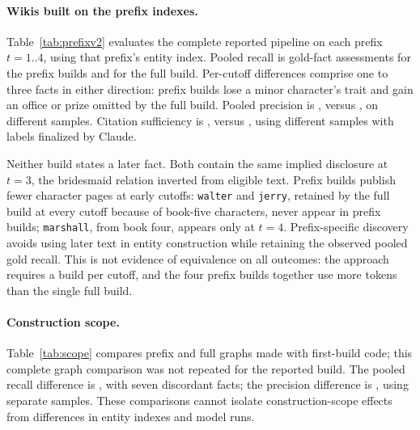 \begin{table}[t]
\caption{The reported \sys built on entity indexes discovered from the prefix (\emph{prefix}: one build
per cutoff, every stage on volumes $1..t$) against the same cutoff of its five-volume build (\emph{full}).
Metrics as in Table~\ref{tab:full-results}; precision is on a different sample of 40 assertions in each
build. The prefix builds received a single LLM labeling pass; the full build's labels were
finalized by Claude Opus~5.5 (Appendix~\ref{app:annotation}). The full
build's tokens, for all five cutoffs at once, are in Table~\ref{tab:efficiency}.
Bold cyan cells mark the higher rate where the builds differ; bold magenta cells mark non-zero
disclosure counts.}
\label{tab:prefixv2}
\end{table}

\paragraph{Wikis built on the prefix indexes.}
Table~\ref{tab:prefixv2} evaluates the complete reported pipeline on each prefix
$t=1..4$, using that prefix's entity index. Pooled recall is
 gold-fact assessments for the prefix builds and
 for the full build. Per-cutoff differences comprise one
to three facts in either direction: prefix builds lose a minor character's trait
and gain an office or prize omitted by the full build. Pooled precision is
, versus , on different samples.
Citation sufficiency is , versus
, using different samples with labels finalized by Claude.

Neither build states a later fact. Both contain the same implied disclosure at $t=3$,
the bridesmaid relation inverted from eligible text. Prefix builds publish fewer
character pages at early cutoffs: \texttt{walter} and \texttt{jerry}, retained by the
full build at every cutoff because of book-five characters, never appear in prefix
builds; \texttt{marshall}, from book four, appears only at $t=4$.
Prefix-specific discovery avoids using later text in entity construction while retaining
the observed pooled gold recall. This is not evidence of equivalence on all outcomes:
the approach requires a build per cutoff, and the four prefix builds together use more
tokens than the single full build.

\paragraph{Construction scope.}
Table~\ref{tab:scope} compares prefix and full graphs made with first-build code;
this complete graph comparison was not repeated for the reported build.
The pooled recall difference is , with seven discordant facts; the precision
difference is , using separate samples. These comparisons cannot isolate
construction-scope effects from differences in entity indexes and model runs.

